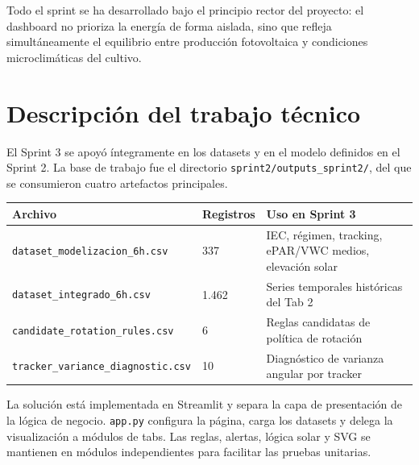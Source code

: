\documentclass[11pt,a4paper]{article}
\begin{document}
Todo el sprint se ha desarrollado bajo el principio rector del proyecto: el dashboard no
prioriza la energía de forma aislada, sino que refleja simultáneamente el equilibrio entre
producción fotovoltaica y condiciones microclimáticas del cultivo.

\section{Descripción del trabajo técnico}

El Sprint 3 se apoyó íntegramente en los datasets y en el modelo definidos en el Sprint 2.
La base de trabajo fue el directorio \texttt{sprint2/outputs\_sprint2/}, del que se consumieron
cuatro artefactos principales.

\begin{longtable}{p{} p{} p{}}
\textbf{Archivo} & \textbf{Registros} & \textbf{Uso en Sprint 3} \\
\hline
\texttt{dataset\_modelizacion\_6h.csv} & 337 & IEC, régimen, tracking, ePAR/VWC medios, elevación solar \\
\texttt{dataset\_integrado\_6h.csv}    & 1.462 & Series temporales históricas del Tab 2 \\
\texttt{candidate\_rotation\_rules.csv} & 6 & Reglas candidatas de política de rotación \\
\texttt{tracker\_variance\_diagnostic.csv} & 10 & Diagnóstico de varianza angular por tracker \\
\end{longtable}

La solución está implementada en Streamlit y separa la capa de presentación de la lógica de
negocio. \texttt{app.py} configura la página, carga los datasets y delega la visualización a
módulos de tabs. Las reglas, alertas, lógica solar y SVG se mantienen en módulos
independientes para facilitar las pruebas unitarias.
\end{document}

